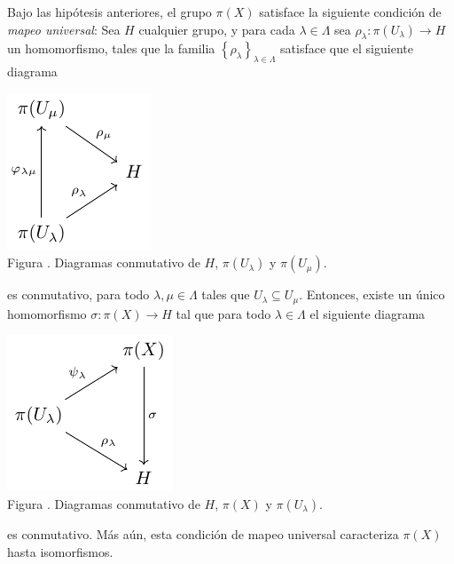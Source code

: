 \documentclass[12pt]{report}
\theoremstyle{largebreak}
\newcommand\cf[3]{\ensuremath{#1:#2\rightarrow#3}}
\newcounter{figcount}
\begin{document}
    \begin{theor}
        Bajo las hipótesis anteriores, el grupo $\pi(X)$ satisface la siguiente condición de \textit{mapeo universal}: Sea $H$ cualquier grupo, y para cada $\lambda\in\Lambda$ sea $\cf{\rho_\lambda}{\pi(U_\lambda)}{H}$ un homomorfismo, tales que la familia $\left\{\rho_\lambda \right\}_{\lambda\in\Lambda}$ satisface que el siguiente diagrama

        \begin{minipage}{\textwidth}
            \begin{center}
                \includegraphics[scale=1.5]{images/fig_4.pdf}\\
                Figura \thefigcount. Diagramas conmutativo de $H$, $\pi(U_\lambda)$ y $\pi(U_\mu)$.
            \end{center}
        \end{minipage}

        es conmutativo, para todo $\lambda,\mu\in\Lambda$ tales que $U_\lambda\subseteq U_\mu$. Entonces, existe un único homomorfismo $\cf{\sigma}{\pi(X)}{H}$ tal que para todo $\lambda\in\Lambda$ el siguiente diagrama

        \begin{minipage}{\textwidth}
            \begin{center}
                \includegraphics[scale=1.5]{images/fig_5.pdf}\\
                Figura \thefigcount. Diagramas conmutativo de $H$, $\pi(X)$ y $\pi(U_\lambda)$.
            \end{center}
        \end{minipage}

        es conmutativo. Más aún, esta condición de mapeo universal caracteriza $\pi(X)$ hasta isomorfismos.
    \end{theor}
\end{document}
